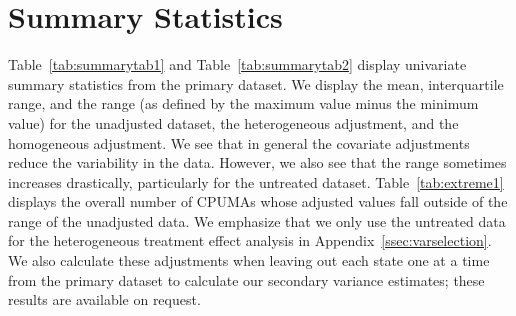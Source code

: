 \section{Summary Statistics}
\label{sec:appendixsumstat}

Table~\ref{tab:summarytab1} and Table~\ref{tab:summarytab2} display univariate summary statistics from the primary dataset. We display the mean, interquartile range, and the range (as defined by the maximum value minus the minimum value) for the unadjusted dataset, the heterogeneous adjustment, and the homogeneous adjustment. We see that in general the covariate adjustments reduce the variability in the data. However, we also see that the range sometimes increases drastically, particularly for the untreated dataset. Table~\ref{tab:extreme1} displays the overall number of CPUMAs whose adjusted values fall outside of the range of the unadjusted data. We emphasize that we only use the untreated data for the heterogeneous treatment effect analysis in Appendix~\ref{ssec:varselection}. We also calculate these adjustments when leaving out each state one at a time from the primary dataset to calculate our secondary variance estimates; these results are available on request. 

